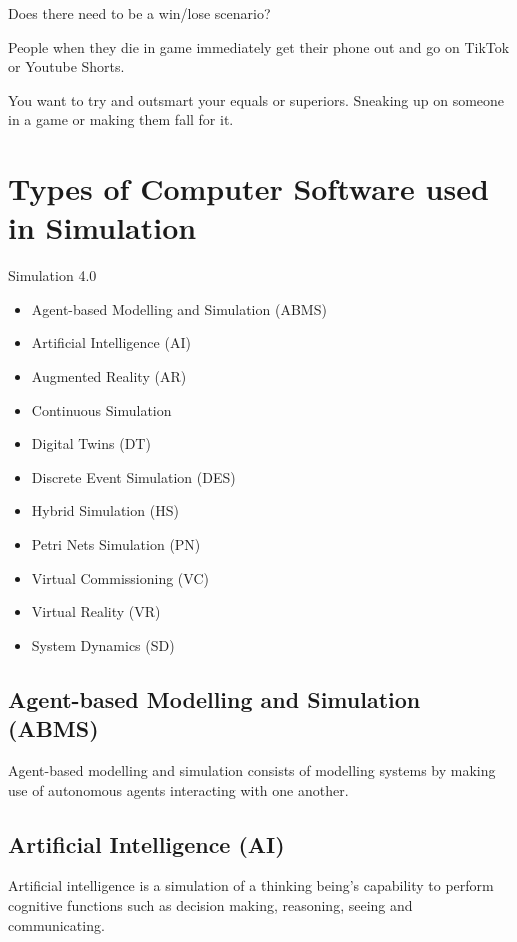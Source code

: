 \documentclass{article}
\begin{document}
Does there need to be a win/lose scenario? 

People when they die in game immediately get their phone out and go on TikTok or Youtube Shorts.

You want to try and outsmart your equals or superiors. Sneaking up on someone in a game or making them fall for it.

\section{Types of Computer Software used in Simulation}

Simulation 4.0 \cite{DEPAULAFERREIRA2020106868}

\begin{itemize}
    \item Agent-based Modelling and Simulation (ABMS)
    \item Artificial Intelligence (AI)
    \item Augmented Reality (AR)
    \item Continuous Simulation
    \item Digital Twins (DT)
    \item Discrete Event Simulation (DES)
    \item Hybrid Simulation (HS)
    \item Petri Nets Simulation (PN)
    \item Virtual Commissioning (VC)
    \item Virtual Reality (VR)    
    \item System Dynamics (SD)    
\end{itemize}

\subsection{Agent-based Modelling and Simulation (ABMS)}

Agent-based modelling and simulation consists of modelling systems by making use of autonomous agents interacting with one another. \cite{1574234}

\subsection{Artificial Intelligence (AI)}

Artificial intelligence is a simulation of a thinking being's capability to perform cognitive functions such as decision making, reasoning, seeing and communicating.
\end{document}
